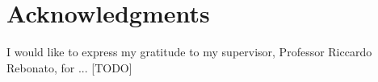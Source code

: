 \chapter*{Acknowledgments}


I would like to express my gratitude to my supervisor, Professor Riccardo Rebonato, for ... [TODO]
